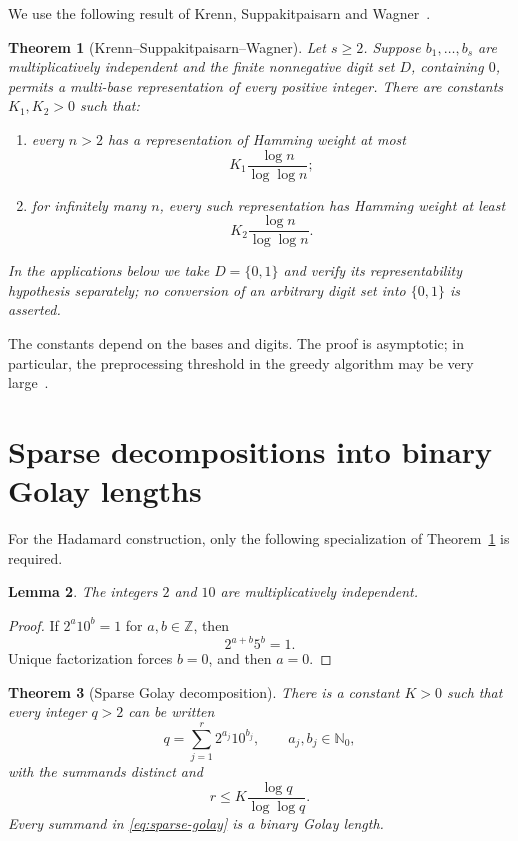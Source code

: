 \documentclass[11pt]{article}
\newtheorem{theorem}{Theorem}[section]
\newtheorem{lemma}[theorem]{Lemma}
\newcommand{\N}{\mathbb{N}}
\begin{document}
We use the following result of Krenn, Suppakitpaisarn and Wagner~\cite{Krenn2020}.

\begin{theorem}[Krenn--Suppakitpaisarn--Wagner]\label{thm:ksw}
Let $s\ge2$.  Suppose $b_1,\ldots,b_s$ are multiplicatively independent and the finite nonnegative digit set $D$, containing $0$, permits a multi-base representation of every positive integer.  There are constants $K_1,K_2>0$ such that:
\begin{enumerate}
\item every $n>2$ has a representation of Hamming weight at most
\[
K_1\frac{\log n}{\log\log n};
\]
\item for infinitely many $n$, every such representation has Hamming weight at least
\[
K_2\frac{\log n}{\log\log n}.
\]
\end{enumerate}
In the applications below we take $D=\{0,1\}$ and verify its representability hypothesis separately; no conversion of an arbitrary digit set into $\{0,1\}$ is asserted.
\end{theorem}

The constants depend on the bases and digits.  The proof is asymptotic; in particular, the preprocessing threshold in the greedy algorithm may be very large~\cite{Krenn2020}.

\section{Sparse decompositions into binary Golay lengths}
For the Hadamard construction, only the following specialization of Theorem~\ref{thm:ksw} is required.

\begin{lemma}\label{lem:independence}
The integers $2$ and $10$ are multiplicatively independent.
\end{lemma}
\begin{proof}
If $2^a10^b=1$ for $a,b\in\mathbb Z$, then
\[
2^{a+b}5^b=1.
\]
Unique factorization forces $b=0$, and then $a=0$.
\end{proof}

\begin{theorem}[Sparse Golay decomposition]\label{thm:sparse-golay}
There is a constant $K>0$ such that every integer $q>2$ can be written
\begin{equation}\label{eq:sparse-golay}
q=\sum_{j=1}^{r}2^{a_j}10^{b_j},
\qquad a_j,b_j\in\N_0,
\end{equation}
with the summands distinct and
\[
r\le K\frac{\log q}{\log\log q}.
\]
Every summand in \eqref{eq:sparse-golay} is a binary Golay length.
\end{theorem}
\end{document}
